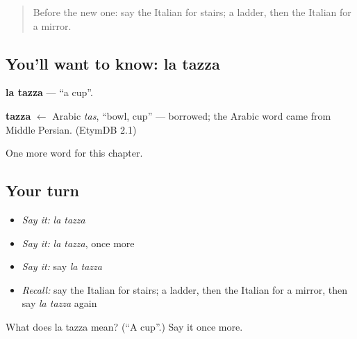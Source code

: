 \label{lesson:IT-C58-tazza}



\begin{quote}
Before the new one: say the Italian for stairs; a ladder, then the Italian for a mirror.
\end{quote}

\subsection*{You'll want to know: la tazza}
\textbf{la tazza} — \textquotedblleft{}a cup\textquotedblright{}.

\begin{cousinweb}
\textbf{tazza} $\leftarrow$ Arabic \emph{tas}, \textquotedblleft{}bowl, cup\textquotedblright{} — borrowed; the Arabic word came from Middle Persian. (EtymDB 2.1)
\end{cousinweb}

\begin{grammarlens}[title={What you've built}]
One more word for this chapter.
\end{grammarlens}

\subsection*{Your turn}
\begin{itemize}
\raggedright
  \item \emph{Say it:} \emph{la tazza}
  \item \emph{Say it:} \emph{la tazza}, once more
  \item \emph{Say it:} say \emph{la tazza}
  \item \emph{Recall:} say the Italian for stairs; a ladder, then the Italian for a mirror, then say \emph{la tazza} again
\end{itemize}

\begin{tcolorbox}[breakable,colback=teal!4,colframe=teal!35!black,title={Before you move on}]
What does la tazza mean? (\textquotedblleft{}A cup\textquotedblright{}.) Say it once more.
\end{tcolorbox}
